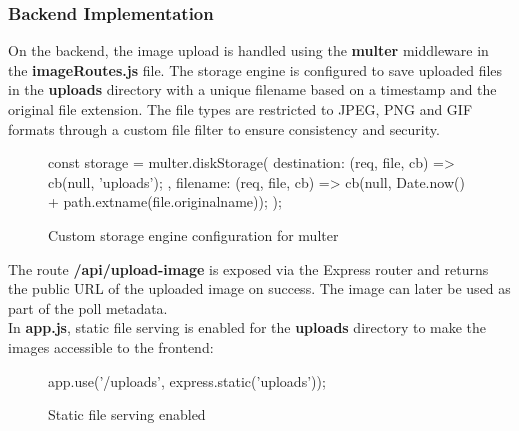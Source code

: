 \documentclass[a4paper,12pt]{report}
\begin{document}
\subsubsection{Backend Implementation}
On the backend, the image upload is handled using the \textbf{multer} middleware in the \textbf{imageRoutes.js} file. The storage engine is configured to save uploaded files in the \textbf{uploads} directory with a unique filename based on a timestamp and the original file extension. The file types are restricted to JPEG, PNG and GIF formats through a custom file filter to ensure consistency and security.\parencite{expressmulter}
\begin{figure}[H]
	\begin{code}
		const storage = multer.diskStorage({
			destination: (req, file, cb) => {
				cb(null, 'uploads');
			},
			filename: (req, file, cb) => {
				cb(null, Date.now() + path.extname(file.originalname));
			}
		});
	\end{code}
	\caption{Custom storage engine configuration for multer}
	\label{fig:multer_config}
\end{figure}
The route \textbf{/api/upload-image} is exposed via the Express router and returns the public URL of the uploaded image on success. The image can later be used as part of the poll metadata.\\
In \textbf{app.js}, static file serving is enabled for the \textbf{uploads} directory to make the images accessible to the frontend:
\begin{figure}[H]
	\begin{code}
		app.use('/uploads', express.static('uploads'));
	\end{code}
	\caption{Static file serving enabled}
	\label{fig:static_file_serving}
\end{figure}
\end{document}
